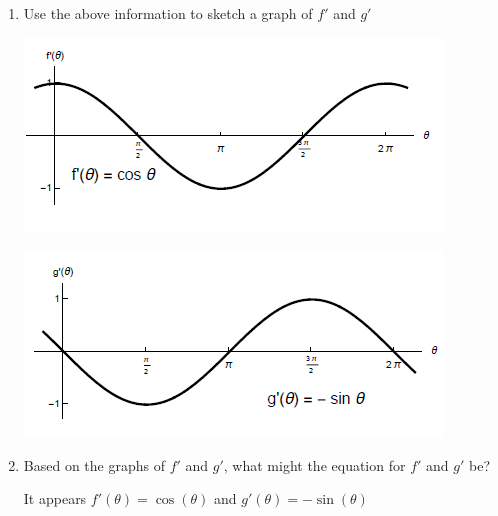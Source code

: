 \documentclass[nooutcomes]{ximera}
\begin{document}
\begin{problem}
\begin{enumerate}
		\item Use the above information to sketch a graph of $f'$ and $g'$
		\begin{freeResponse} \hfil
		\begin{image}
		\includegraphics{figure10.png}
		\end{image}
		\begin{image}
		\includegraphics{figure11.png}
		\end{image}
		\end{freeResponse}

	\item Based on the graphs of $f'$ and $g'$, what might the equation for $f'$ and $g'$ be?
		\begin{freeResponse}
			It appears $f'(\theta)=\cos(\theta)$ and $g'(\theta)=-\sin(\theta)$
		\end{freeResponse}


\end{enumerate}
\end{problem}
\end{document}

